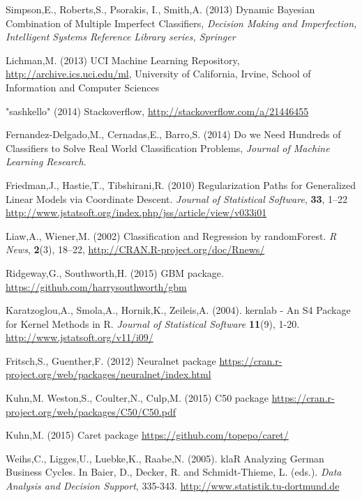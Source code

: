 \documentclass{bioinfo}
\begin{document}
\begin{thebibliography}{9}

Simpson,E., Roberts,S., Psorakis, I., Smith,A. (2013) Dynamic Bayesian Combination of Multiple Imperfect Classifiers, {\it Decision Making and Imperfection, Intelligent Systems Reference Library series, Springer}

Lichman,M. (2013) UCI Machine Learning Repository, \url{http://archive.ics.uci.edu/ml}, University of California, Irvine, School of Information and Computer Sciences

"sashkello" (2014) Stackoverflow, \url{http://stackoverflow.com/a/21446455}

Fernandez-Delgado,M., Cernadas,E., Barro,S. (2014) Do we Need Hundreds of Classifiers to Solve Real World Classification Problems, {\it Journal of Machine Learning Research}.

Friedman,J., Hastie,T., Tibshirani,R. (2010) Regularization Paths for Generalized Linear Models via Coordinate Descent. \textit{Journal of Statistical Software}, \textbf{33}, 1--22 \url{http://www.jstatsoft.org/index.php/jss/article/view/v033i01}

Liaw,A., Wiener,M. (2002) Classification and Regression by randomForest. \textit{R News}, \textbf{2}(3), 18--22, \url{http://CRAN.R-project.org/doc/Rnews/}

Ridgeway,G., Southworth,H. (2015) GBM package. \url{https://github.com/harrysouthworth/gbm}

Karatzoglou,A., Smola,A., Hornik,K., Zeileis,A. (2004). kernlab - An S4 Package for Kernel Methods in R. \textit{Journal of Statistical Software} \textbf{11}(9), 1-20. \url{http://www.jstatsoft.org/v11/i09/}

Fritsch,S., Guenther,F. (2012) Neuralnet package \url{https://cran.r-project.org/web/packages/neuralnet/index.html}

Kuhn,M. Weston,S., Coulter,N., Culp,M. (2015) C50 package \url{https://cran.r-project.org/web/packages/C50/C50.pdf}

Kuhn,M. (2015) Caret package \url{https://github.com/topepo/caret/}

Weihs,C., Ligges,U., Luebke,K., Raabe,N. (2005). klaR Analyzing German Business Cycles. In Baier, D., Decker, R. and Schmidt-Thieme, L. (eds.). \textit{Data Analysis and Decision Support}, 335-343. \url{http://www.statistik.tu-dortmund.de}


\end{thebibliography}
\end{document}
